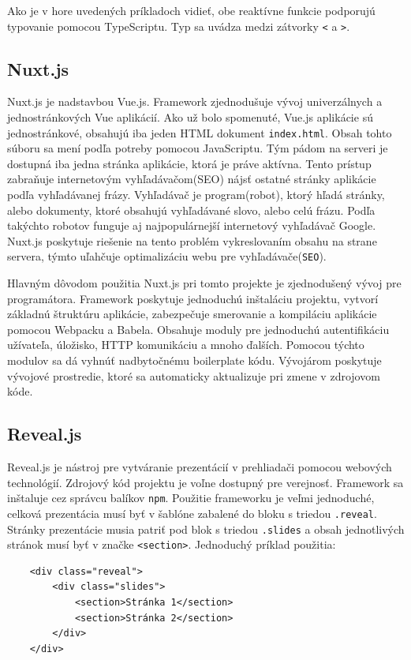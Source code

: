 Ako je v hore uvedených príkladoch vidieť, obe reaktívne funkcie podporujú typovanie pomocou TypeScriptu. Typ sa uvádza medzi zátvorky \texttt{<} a \texttt{>}.

\subsection{Nuxt.js}
Nuxt.js je nadstavbou Vue.js. Framework zjednodušuje vývoj univerzálnych a jednostránkových Vue aplikácií. Ako už bolo spomenuté, Vue.js aplikácie sú jednostránkové, obsahujú iba jeden HTML dokument \texttt{index.html}. Obsah tohto súboru sa mení podľa potreby pomocou JavaScriptu. Tým pádom na serveri je dostupná iba jedna stránka aplikácie, ktorá je práve aktívna. Tento prístup zabraňuje internetovým vyhľadávačom(SEO) nájsť ostatné stránky aplikácie podľa vyhľadávanej frázy. Vyhľadávač je program(robot), ktorý hľadá stránky, alebo dokumenty, ktoré obsahujú vyhľadávané slovo, alebo celú frázu. Podľa takýchto robotov funguje aj najpopulárnejší internetový vyhľadávač Google. Nuxt.js poskytuje riešenie na tento problém vykreslovaním obsahu na strane servera, týmto uľahčuje optimalizáciu webu pre vyhľadávače(\texttt{SEO}).

Hlavným dôvodom použitia Nuxt.js pri tomto projekte je zjednodušený vývoj pre programátora. Framework poskytuje jednoduchú inštaláciu projektu, vytvorí základnú štruktúru aplikácie, zabezpečuje smerovanie a kompiláciu aplikácie pomocou Webpacku a Babela. Obsahuje moduly pre jednoduchú autentifikáciu užívateľa, úložisko, HTTP komunikáciu a mnoho ďalších. Pomocou týchto modulov sa dá vyhnúť nadbytočnému boilerplate kódu. Vývojárom poskytuje vývojové prostredie, ktoré sa automaticky aktualizuje pri zmene v zdrojovom kóde.

\subsection{Reveal.js}
Reveal.js je nástroj pre vytváranie prezentácií v prehliadači pomocou webových technológií. Zdrojový kód projektu je voľne dostupný pre verejnosť. Framework sa inštaluje cez správcu balíkov \texttt{npm}. Použitie frameworku je veľmi jednoduché, celková prezentácia musí byť v šablóne zabalené do bloku s triedou \texttt{.reveal}. Stránky prezentácie musia patriť pod blok s triedou \texttt{.slides} a obsah jednotlivých stránok musí byť v značke \texttt{<section>}. Jednoduchý príklad použitia:

    \begin{verbatim}
    <div class="reveal">
        <div class="slides">
            <section>Stránka 1</section>
            <section>Stránka 2</section>
        </div>
    </div>
    \end{verbatim}


